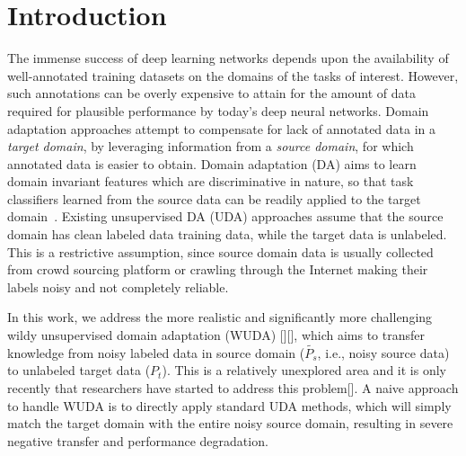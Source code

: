 \section{Introduction}
The immense success of deep learning networks depends upon the availability of well-annotated training datasets on the domains of the tasks of interest. 
However, such annotations can be overly expensive to attain for the amount of data required for plausible performance by today’s deep neural networks. 
Domain adaptation approaches attempt to compensate for lack of annotated data in a \textit{target domain}, by leveraging information from a \textit{source domain}, for which annotated data is easier to obtain. 
Domain adaptation (DA) aims to learn domain invariant features which are discriminative in nature, so that task classifiers learned from the source data can be readily applied to the target domain~\cite{uda,dann,ctc,ltdan,atda,saito2017maximum}.
Existing unsupervised DA (UDA) approaches assume that the source domain has clean labeled data training data, while the target data is unlabeled. 
This is a restrictive assumption, since source domain data is usually collected from crowd sourcing platform or crawling through the Internet making their labels noisy and not completely reliable.

In this work, we address the more realistic and significantly more challenging wildy unsupervised domain adaptation (WUDA) [][], which aims to transfer knowledge from noisy labeled data in source domain ($\tilde{P_s}$, i.e., noisy source data) to unlabeled target data ($P_t$).
This is a relatively unexplored area and it is only recently that researchers have started to address this problem[].
A naive approach to handle WUDA is to directly apply standard UDA methods, which will simply match the target domain with the entire noisy
source domain, resulting in severe negative transfer and performance degradation. 

